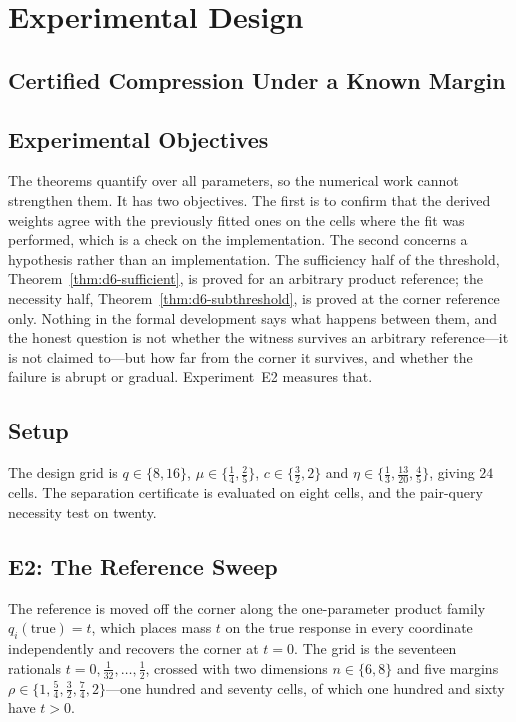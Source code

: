 \documentclass[conference]{IEEEtran}
\theoremstyle{definition}
\begin{document}
\section{Experimental Design}

\subsection{Certified Compression Under a Known Margin}
\label{sec:d6-expdesign}

\subsection{Experimental Objectives}

The theorems quantify over all parameters, so the numerical work cannot strengthen them. It
has two objectives. The first is to confirm that the derived weights agree with the previously
fitted ones on the cells where the fit was performed, which is a check on the implementation.
The second concerns a hypothesis rather than an implementation. The sufficiency half of the
threshold, Theorem~\ref{thm:d6-sufficient}, is proved for an arbitrary product reference; the
necessity half, Theorem~\ref{thm:d6-subthreshold}, is proved at the corner reference only.
Nothing in the formal development says what happens between them, and the honest question is
not whether the witness survives an arbitrary reference---it is not claimed to---but how far
from the corner it survives, and whether the failure is abrupt or gradual. Experiment~E2
measures that.

\subsection{Setup}

The design grid is $q\in\{8,16\}$, $\mu\in\{\tfrac14,\tfrac25\}$, $c\in\{\tfrac32,2\}$ and
$\eta\in\{\tfrac13,\tfrac{13}{20},\tfrac45\}$, giving $24$ cells. The separation certificate
is evaluated on eight cells, and the pair-query necessity test on twenty.

\subsection{E2: The Reference Sweep}
\label{sec:d6-e2}

The reference is moved off the corner along the one-parameter product family
$q_{i}(\mathrm{true})=t$, which places mass $t$ on the true response in every coordinate
independently and recovers the corner at $t=0$. The grid is the seventeen rationals
$t=0,\tfrac1{32},\dots,\tfrac12$, crossed with two dimensions $n\in\{6,8\}$ and five margins
$\rho\in\{1,\tfrac54,\tfrac32,\tfrac74,2\}$---one hundred and seventy cells, of which one
hundred and sixty have $t>0$.
\end{document}
